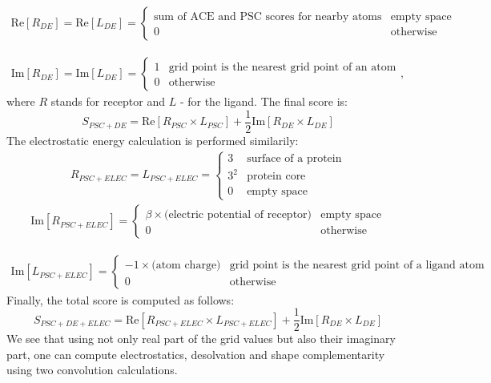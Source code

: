 \begin{eqnarray*}
 \mbox{Re}\left[R_{DE}\right]=\mbox{Re}\left[L_{DE}\right]=\begin{cases}
                  \mbox{sum of ACE and PSC scores for nearby atoms} & \mbox{empty space}\\
                  0 & \mbox{otherwise}
                 \end{cases}
\end{eqnarray*}

\begin{eqnarray*}
 \mbox{Im}\left[R_{DE}\right]=\mbox{Im}\left[L_{DE}\right]=\begin{cases}
                  1 & \mbox{grid point is the nearest grid point of an atom}\\
                  0 & \mbox{otherwise}
                 \end{cases},
\end{eqnarray*}
where $R$ stands for receptor and $L$ - for the ligand. The final score is:
\begin{equation*}
 S_{PSC+DE}=\mbox{Re}\left[R_{PSC} \times L_{PSC}\right] + \frac{1}{2}\mbox{Im}\left[R_{DE} \times L_{DE}\right]
\end{equation*}
The electrostatic energy calculation is performed similarily:
\begin{eqnarray*}
 R_{PSC+ELEC}=L_{PSC+ELEC}=\begin{cases}
                  3 & \mbox{surface of a protein}\\
                  3^2 & \mbox{protein core}\\
                  0 & \mbox{empty space}
                 \end{cases}
\end{eqnarray*}
\begin{eqnarray*}
 \mbox{Im}\left[R_{PSC+ELEC}\right]=\begin{cases}
                  \beta \times \mbox{(electric potential of receptor)} & \mbox{empty space}\\
                  0 & \mbox{otherwise}
                 \end{cases}
\end{eqnarray*}

\begin{eqnarray*}
 \mbox{Im}\left[L_{PSC+ELEC}\right]=\begin{cases}
                  -1\times\mbox{(atom charge)} & \mbox{grid point is the nearest grid point of a ligand atom}\\
                  0 & \mbox{otherwise}
                 \end{cases}
\end{eqnarray*}
Finally, the total score is computed as follows:
\begin{equation*}
 S_{PSC+DE+ELEC}=\mbox{Re}\left[R_{PSC+ELEC} \times L_{PSC+ELEC}\right] + \frac{1}{2}\mbox{Im}\left[R_{DE} \times L_{DE}\right]
\end{equation*}
We see that using not only real part of the grid values but also their imaginary part, one can compute electrostatics, desolvation and 
shape complementarity using two convolution calculations.


